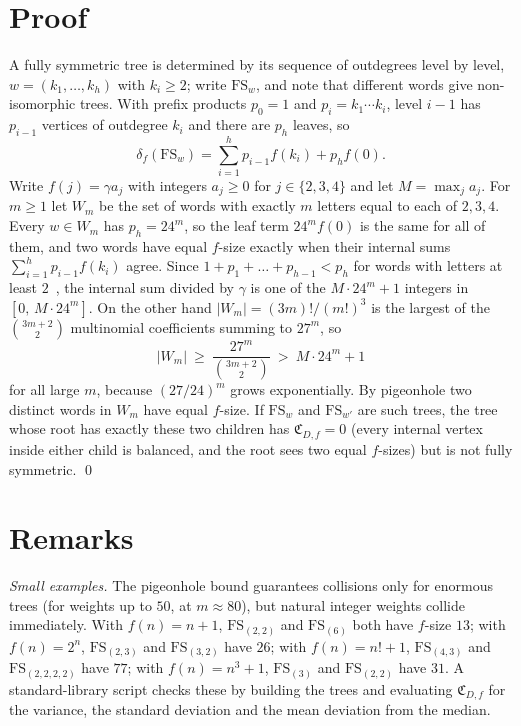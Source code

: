 \documentclass[11pt]{amsart}
\theoremstyle{remark}
\begin{document}
\section{Proof}

A fully symmetric tree is determined by its sequence of outdegrees level by level, $w=(k_1,\dots,k_h)$ with $k_i\ge2$; write $\mathrm{FS}_w$, and note that different words give non-isomorphic trees. With prefix products $p_0=1$ and $p_i=k_1\cdots k_i$, level $i-1$ has $p_{i-1}$ vertices of outdegree $k_i$ and there are $p_h$ leaves, so
\[
\delta_f(\mathrm{FS}_w)=\sum_{i=1}^{h}p_{i-1}f(k_i)+p_hf(0).
\]
Write $f(j)=\gamma a_j$ with integers $a_j\ge0$ for $j\in\{2,3,4\}$ and let $M=\max_j a_j$. For $m\ge1$ let $W_m$ be the set of words with exactly $m$ letters equal to each of $2,3,4$. Every $w\in W_m$ has $p_h=24^m$, so the leaf term $24^mf(0)$ is the same for all of them, and two words have equal $f$-size exactly when their internal sums $\sum_{i=1}^h p_{i-1}f(k_i)$ agree. Since $1+p_1+\dots+p_{h-1}<p_h$ for words with letters at least $2$~\cite[Lemma~15]{MRR2018}, the internal sum divided by $\gamma$ is one of the $M\cdot24^m+1$ integers in $[0,\,M\cdot24^m]$. On the other hand $|W_m|=(3m)!/(m!)^3$ is the largest of the $\binom{3m+2}{2}$ multinomial coefficients summing to $27^m$, so
\[
|W_m|\ \ge\ \frac{27^m}{\binom{3m+2}{2}}\ >\ M\cdot 24^m+1
\]
for all large $m$, because $(27/24)^m$ grows exponentially. By pigeonhole two distinct words in $W_m$ have equal $f$-size. If $\mathrm{FS}_w$ and $\mathrm{FS}_{w'}$ are such trees, the tree whose root has exactly these two children has $\mathfrak C_{D,f}=0$ (every internal vertex inside either child is balanced, and the root sees two equal $f$-sizes) but is not fully symmetric. \qed

\section{Remarks}

\emph{Small examples.} The pigeonhole bound guarantees collisions only for enormous trees (for weights up to $50$, at $m\approx 80$), but natural integer weights collide immediately. With $f(n)=n+1$, $\mathrm{FS}_{(2,2)}$ and $\mathrm{FS}_{(6)}$ both have $f$-size $13$; with $f(n)=2^n$, $\mathrm{FS}_{(2,3)}$ and $\mathrm{FS}_{(3,2)}$ have $26$; with $f(n)=n!+1$, $\mathrm{FS}_{(4,3)}$ and $\mathrm{FS}_{(2,2,2,2)}$ have $77$; with $f(n)=n^3+1$, $\mathrm{FS}_{(3)}$ and $\mathrm{FS}_{(2,2)}$ have $31$. A standard-library script checks these by building the trees and evaluating $\mathfrak C_{D,f}$ for the variance, the standard deviation and the mean deviation from the median.
\end{document}

